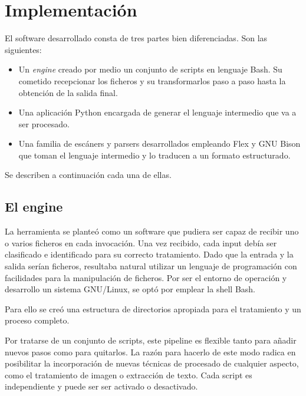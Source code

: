
\chapter{Implementación}
\label{chap:implemetación}

El software desarrollado consta de tres partes bien diferenciadas. Son las siguientes:

\begin{itemize}
    \item Un \emph{engine} creado por medio un conjunto de scripts en lenguaje Bash. Su cometido recepcionar los ficheros y su transformarlos paso a paso hasta la obtención de la salida final.
    \item Una aplicación Python encargada de generar el lenguaje intermedio que va a ser procesado.
    \item Una familia de escáners y parsers desarrollados empleando Flex \cite{estes_flex_2021} y GNU Bison \cite{free_software_foundation_inc_bison_nodate} que toman el lenguaje intermedio y lo traducen a un formato estructurado.
\end{itemize}

Se describen a continuación cada una de ellas.

\section{El engine}
La herramienta se planteó como un software que pudiera ser capaz de recibir uno o varios ficheros en cada invocación. Una vez recibido, cada input debía ser clasificado e identificado para su correcto tratamiento. Dado que la entrada y la salida serían ficheros, resultaba natural utilizar un lenguaje de programación con facilidades para la manipulación de ficheros. Por ser el entorno de operación y desarrollo un sistema GNU/Linux, se optó por emplear la shell Bash.

Para ello se creó una estructura de directorios apropiada para el tratamiento y un proceso completo. 

Por tratarse de un conjunto de scripts, este pipeline es flexible tanto para añadir nuevos pasos como para quitarlos. La razón para hacerlo de este modo radica en posibilitar la incorporación de nuevas técnicas de procesado de cualquier aspecto, como el tratamiento de imagen o extracción de texto. Cada script es independiente y puede ser ser activado o desactivado.

